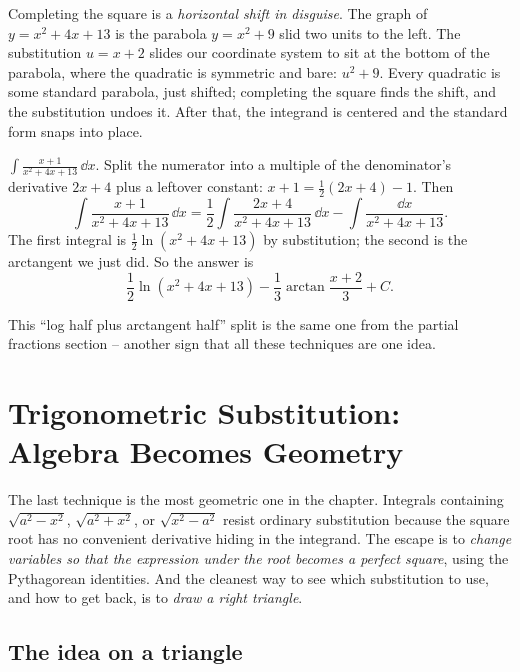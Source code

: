 \begin{happeningbox}
Completing the square is a \emph{horizontal shift in disguise}. The graph of
$y = x^2 + 4x + 13$ is the parabola $y = x^2 + 9$ slid two units to the left.
The substitution $u = x+2$ slides our coordinate system to sit at the bottom
of the parabola, where the quadratic is symmetric and bare: $u^2 + 9$. Every
quadratic is some standard parabola, just shifted; completing the square finds
the shift, and the substitution undoes it. After that, the integrand is
centered and the standard form snaps into place.
\end{happeningbox}

\begin{example}
\label{ch24:ex-complete}
$\displaystyle \int \frac{x + 1}{x^2 + 4x + 13}\,\dd x.$ Split the numerator into
a multiple of the denominator's derivative $2x+4$ plus a leftover constant:
$x + 1 = \tfrac{1}{2}(2x+4) - 1$. Then
\[
\int \frac{x+1}{x^2+4x+13}\,\dd x
= \frac{1}{2}\int \frac{2x+4}{x^2+4x+13}\,\dd x - \int \frac{\dd x}{x^2+4x+13}.
\]
The first integral is $\tfrac{1}{2}\ln(x^2+4x+13)$ by substitution; the second
is the arctangent we just did. So the answer is
\[
\frac{1}{2}\ln(x^2+4x+13) - \frac{1}{3}\arctan\!\frac{x+2}{3} + C.
\]
\end{example}

This ``log half plus arctangent half'' split is the same one from the partial
fractions section -- another sign that all these techniques are one idea.

\section{Trigonometric Substitution: Algebra Becomes Geometry}
\label{ch24:trig-sub}

The last technique is the most geometric one in the chapter. Integrals
containing $\sqrt{a^2 - x^2}$, $\sqrt{a^2 + x^2}$, or $\sqrt{x^2 - a^2}$ resist
ordinary substitution because the square root has no convenient derivative
hiding in the integrand. The escape is to \emph{change variables so that the
expression under the root becomes a perfect square}, using the Pythagorean
identities. And the cleanest way to see which substitution to use, and how to
get back, is to \emph{draw a right triangle}.

\subsection{The idea on a triangle}

